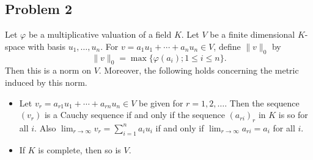 \subsection*{Problem 2}

Let $\varphi$ be a multiplicative valuation of a field $K$. Let $V$ be a finite dimensional $K$-space with basis $u_1, \ldots, u_n$. For $v = a_1 u_1 + \cdots + a_n u_n \in V$, define $\|v\|_0$ by
$$\|v\|_0 = \max\{\varphi(a_i); 1 \leq i \leq n\}.$$
Then this is a norm on $V$. Moreover, the following holds concerning the metric induced by this norm.
\begin{itemize}
    \item[(i)] Let $v_r = a_{r1}u_1 + \cdots + a_{rn}u_n \in V$ be given for $r = 1, 2, \ldots$. Then the sequence $(v_r)$ is a Cauchy sequence if and only if the sequence $(a_{ri})_r$ in $K$ is so for all $i$. Also $\lim_{r\to\infty} v_r = \sum_{i=1}^n a_i u_i$ if and only if $\lim_{r\to\infty} a_{ri} = a_i$ for all $i$.
    \item[(ii)] If $K$ is complete, then so is $V$.
\end{itemize}

